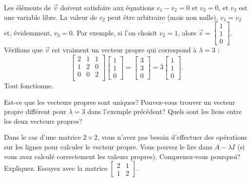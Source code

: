 \begin{example}
Les éléments de $\vec{v}$ doivent satisfaire aux équations
$v_1 - v_2 = 0$ et $v_3 = 0$, et $v_2$ est une variable libre. La valeur de $v_2$ peut être arbitraire (mais non nulle),
$v_1 = v_2$ et, évidemment, $v_3 = 0$.
Par exemple, si l'on choisit $v_2 = 1$, alors
$\vec{v} =
\left[ \begin{smallmatrix} 1 \\ 1 \\ 0 \end{smallmatrix} \right]$.
Vérifions que $\vec{v}$ est vraiment un vecteur propre qui correspond à $\lambda = 3$ :
\begin{equation*}
\begin{bmatrix}
2 & 1 & 1 \\
1 & 2 & 0 \\
0 & 0 & 2 \\
\end{bmatrix}
\begin{bmatrix}
1 \\
1 \\
0
\end{bmatrix}
=
\begin{bmatrix}
3 \\
3 \\
0
\end{bmatrix}
=
3
\begin{bmatrix}
1 \\
1 \\
0
\end{bmatrix} .
\end{equation*}
Tout fonctionne.
\end{example}

\begin{exercise}[facile]
Est-ce que les vecteurs propres sont uniques? Pouvez-vous trouver un vecteur propre différent pour $\lambda = 3$ dans l'exemple précédent? Quels sont les liens entre les deux vecteurs propres?
\end{exercise}

\begin{exercise}
Dans le cas d'une matrice $2 \times 2$, vous n'avez pas besoin d'effectuer des opérations sur les lignes pour calculer le vecteur propre. Vous pouvez le lire dans $A-\lambda I$
(si vous avez calculé correctement les valeurs propres). Comprenez-vous pourquoi? Expliquez. Essayez avec la matrice
$\left[ \begin{smallmatrix} 2 & 1 \\ 1 & 2 \end{smallmatrix} \right]$.
\end{exercise}

